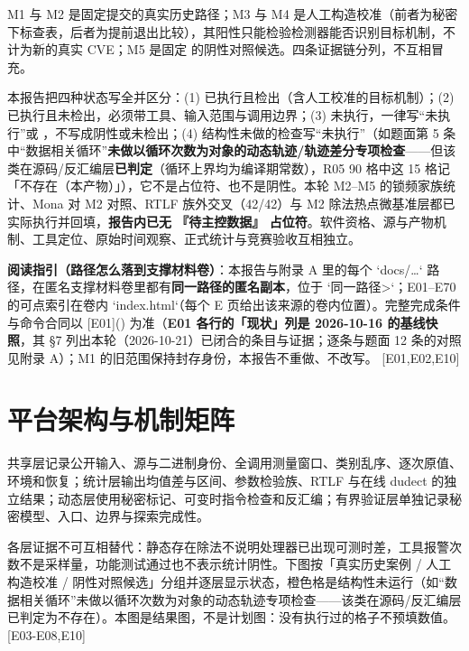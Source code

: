 \documentclass[UTF8,fontset=fandol,11pt,a4paper]{ctexart}
\begin{document}
M1 与 M2 是固定提交的真实历史路径；M3 与 M4 是人工构造校准（前者为秘密下标查表，后者为提前退出比较），其阳性只能检验检测器能否识别目标机制，不计为新的真实 CVE；M5 是固定 \texttt{} 的阴性对照候选。四条证据链分列，不互相冒充。


本报告把四种状态写全并区分：(1) 已执行且检出（含人工校准的目标机制）；(2) 已执行且未检出，必须带工具、输入范围与调用边界；(3) 未执行，一律写“未执行”或 \texttt{}，不写成阴性或未检出；(4) 结构性未做的检查写“未执行”（如题面第 5 条中“数据相关循环”\textbf{未做以循环次数为对象的动态轨迹/轨迹差分专项检查}——但该类在源码/反汇编层\textbf{已判定}（循环上界均为编译期常数），R05 90 格中这 15 格记「不存在（本产物）」），它不是占位符、也不是阴性。本轮 M2–M5 的锁频家族统计、Mona 对 M2 对照、RTLF 族外交叉（42/42）与 M2 除法热点微基准层都已实际执行并回填，\textbf{报告内已无 『待主控数据』 占位符}。软件资格、源与产物机制、工具定位、原始时间观察、正式统计与竞赛验收互相独立。


\textbf{阅读指引（路径怎么落到支撑材料卷）}：本报告与附录 A 里的每个 `docs/…` 路径，在匿名支撑材料卷里都有\textbf{同一路径的匿名副本}，位于 `\texttt{}同一路径>`；E01–E70 的可点索引在卷内 `index.html`（每个 E 页给出该来源的卷内位置）。完整完成条件与命令合同以 [E01](\texttt{}) 为准（\textbf{E01 各行的「现状」列是 2026-10-16 的基线快照}，其 §7 列出本轮（2026-10-21）已闭合的条目与证据；逐条与题面 12 条的对照见附录 A）；M1 的旧范围保持封存身份，本报告不重做、不改写。 [E01,E02,E10]


\section{平台架构与机制矩阵}
共享层记录公开输入、源与二进制身份、全调用测量窗口、类别乱序、逐次原值、环境和恢复；统计层输出均值差与区间、参数检验族、RTLF 与在线 dudect 的独立结果；动态层使用秘密标记、可变时指令检查和反汇编；有界验证层单独记录秘密模型、入口、边界与探索完成性。


各层证据不可互相替代：静态存在除法不说明处理器已出现可测时差，工具报警次数不是采样量，功能测试通过也不表示统计阴性。下图按「真实历史案例 / 人工构造校准 / 阴性对照候选」分组并逐层显示状态，橙色格是结构性未运行（如“数据相关循环”未做以循环次数为对象的动态轨迹专项检查——该类在源码/反汇编层已判定为不存在）。本图是结果图，不是计划图：没有执行过的格子不预填数值。 [E03-E08,E10]
\end{document}
